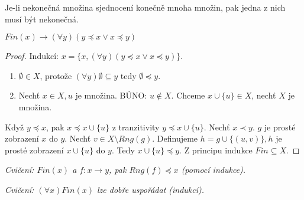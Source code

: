 \begin{dusl}
	Je-li nekonečná množina sjednocení konečně mnoha množin, pak jedna z nich musí být nekonečná.
\end{dusl}

\begin{lemma}
	$Fin(x) \rightarrow (\forall y)( y \preceq x \lor x \preceq y)$
\end{lemma}

\begin{proof}
	Indukcí: $x = \{x, (\forall y)(y \preceq x \lor x \preceq y)\}$.
	
	\begin{enumerate}
		\item $\emptyset \in X$, protože $(\forall y) \emptyset \subseteq y$ tedy $\emptyset \preceq y$.
		\item Nechť $x \in X, u$ je množina. BÚNO: $u \notin X$. Chceme $x \cup \{u\} \in X$, nechť $X$ je množina.
	\end{enumerate}
	
	Když $y \preceq x$, pak $x \preceq x \cup \{u\}$ z tranzitivity $y \preceq x \cup \{u\}$. Nechť $x \prec y$. $g$ je prosté zobrazení $x$ do $y$. Nechť $v \in X \setminus Rng(g)$. Definujeme $h = g \cup \{(u,v)\}, h$ je prosté zobrazení $x \cup \{u\}$ do $y$. Tedy $x \cup \{u\} \preceq y$. Z principu indukce $Fin \subseteq X$.
\end{proof}

\textit{Cvičení: $Fin(x)$ a $f: x \to y$, pak $Rng (f) \preceq x$ (pomocí indukce).}

\textit{Cvičení: $(\forall x) Fin(x)$ lze dobře uspořádat (indukcí).}